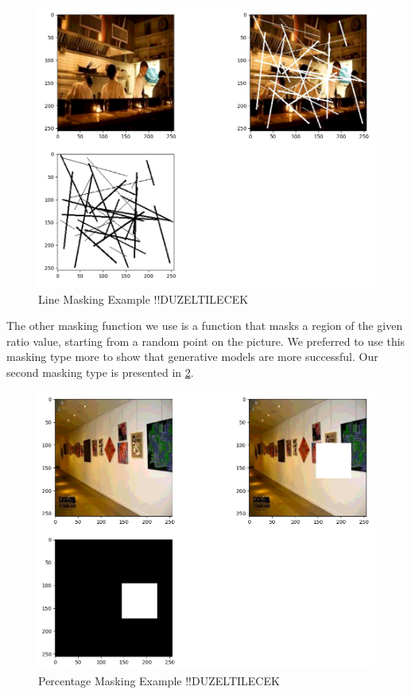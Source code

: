 \begin{figure}[h]
    \centering
    \includegraphics[scale=0.5]{figures/chapter5/linemasking.PNG}
    \caption{Line Masking Example !!DUZELTILECEK}
    \label{fig:linemasking}
\end{figure}

The other masking function we use is a function that masks a region of the given ratio value, starting from a random point on the picture. We preferred to use this masking type more to show that generative models are more successful. Our second masking type is presented in \ref{fig:percentagemasking}.

\begin{figure}[h]
    \centering
    \includegraphics[scale=0.5]{figures/chapter5/percentageMasking.PNG}
    \caption{Percentage Masking Example !!DUZELTILECEK}
    \label{fig:percentagemasking}
\end{figure}

